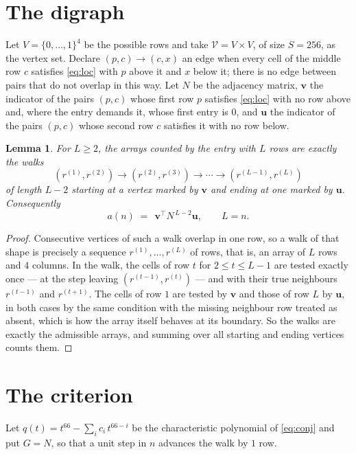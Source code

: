 \documentclass[11pt,a4paper]{article}
\theoremstyle{plain}
\newtheorem{lemma}[theorem]{Lemma}
\theoremstyle{definition}
\begin{document}
\section{The digraph}

Let $V=\{0,\dots,1\}^{4}$ be the possible rows and take
$\mathcal V=V\times V$, of size $S=256$, as the vertex set. Declare $(p,c)\to(c,x)$ an edge
when every cell of the middle row $c$ satisfies \eqref{eq:loc} with $p$ above it and $x$
below it; there is no edge between pairs that do not overlap in this way. Let $N$ be the
adjacency matrix, $\mathbf{v}$ the indicator of the pairs $(p,c)$ whose first row $p$
satisfies \eqref{eq:loc} with no row above and, where the entry demands it, whose first entry is $0$, and $\mathbf{u}$ the indicator of
the pairs $(p,c)$ whose second row $c$ satisfies it with no row below.

\begin{lemma}\label{lem:walk}
For $L\ge2$, the arrays counted by the entry with $L$ rows are exactly the walks
\[
(r^{(1)},r^{(2)})\to(r^{(2)},r^{(3)})\to\cdots\to(r^{(L-1)},r^{(L)})
\]
of length $L-2$ starting at a vertex marked by $\mathbf{v}$ and ending at one marked by
$\mathbf{u}$. Consequently
\[
a(n)\;=\;\,\mathbf{v}^{\!\top}N^{\,L-2}\mathbf{u},\qquad L=n .
\]
\end{lemma}

\begin{proof}
Consecutive vertices of such a walk overlap in one row, so a walk of that shape is
precisely a sequence $r^{(1)},\dots,r^{(L)}$ of rows, that is, an array of $L$ rows
and $4$ columns. In the walk, the cells of row $t$ for $2\le t\le L-1$ are tested
exactly once --- at the step leaving $(r^{(t-1)},r^{(t)})$ --- and with their true
neighbours $r^{(t-1)}$ and $r^{(t+1)}$. The cells of row $1$ are tested by
$\mathbf{v}$ and those of row $L$ by $\mathbf{u}$, in both cases by the same condition
with the missing neighbour row treated as absent, which is how the array itself behaves at
its boundary. So the walks are exactly the admissible arrays, and summing over all starting
and ending vertices counts them.
\end{proof}

\section{The criterion}

Let $q(t)=t^{66}-\sum_i c_i\,t^{66-i}$ be the characteristic polynomial of
\eqref{eq:conj} and put $G=N$, so that a unit step in $n$ advances the walk by
$1$ row.
\end{document}
